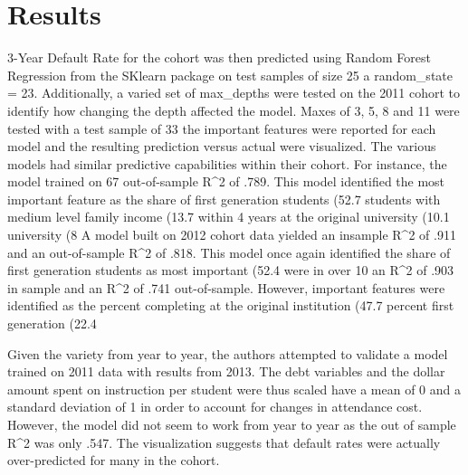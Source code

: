 \documentclass[10pt,twocolumn]{article}
\begin{document}
\section{Results}

3-Year Default Rate for the cohort was then predicted using Random Forest Regression
from the SKlearn package on test samples of size 25%
a random_state = 23. Additionally, a varied set of max_depths were tested on the 2011
cohort to identify how changing the depth affected the model. Maxes of 3, 5, 8 and 11 were
 tested with a test sample of 33%
 the important features were reported for each
model and the resulting prediction versus actual were visualized. The various models
had similar predictive capabilities within their cohort. For instance, the model
trained on 67%
out-of-sample R^2 of .789. This model identified the most important feature as the
share of first generation students (52.7%
students with medium level family income (13.7%
within 4 years at the original university (10.1%
university (8%
A model built on 2012 cohort data yielded an insample R^2 of .911 and an out-of-sample R^2
of .818. This model once again identified the share of first generation students as most important
(52.4%
were in over 10%
an R^2 of .903 in sample and an R^2 of .741 out-of-sample. However, important features
were identified as the percent completing at the original institution (47.7%
percent first generation (22.4%

Given the variety from year to year, the authors attempted to validate a model
trained on 2011 data with results from 2013. The debt variables and the dollar
amount spent on instruction per student were thus scaled have a mean of 0 and a standard
deviation of 1 in order to account for changes in attendance cost. However, the
model did not seem to work from year to year as the out of sample R^2 was only .547. The
visualization suggests that default rates were actually over-predicted for many in the
cohort.
\end{document}
